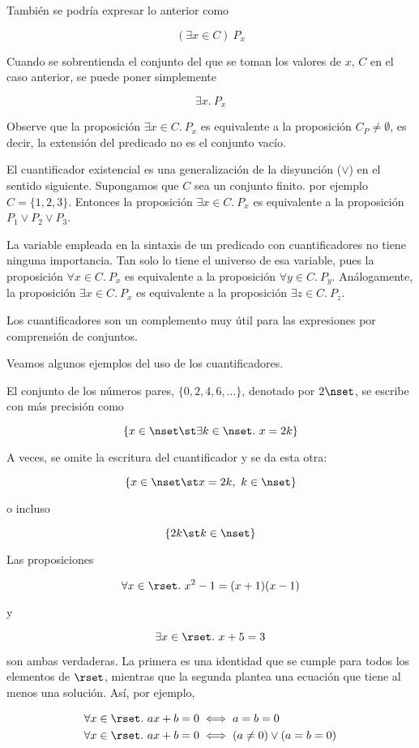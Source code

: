 También se podría expresar lo anterior como

$$ (\exists x \in C) \ P_x $$

Cuando se sobrentienda el conjunto del que se toman los valores de $x$, $C$
en el caso anterior, se puede poner simplemente

$$ \exists x. \ P_x $$

Observe que la proposición $\exists x \in C.\ P_x$ es equivalente a la
proposición $C_P \neq \emptyset$, es decir, la extensión del predicado no es
el conjunto vacío.

El cuantificador existencial es una generalización de la disyunción ($\lor$)
en el sentido siguiente. Supongamos que $C$ sea un conjunto finito. por
ejemplo $C = \{1, 2, 3\}$. Entonces la proposición $\exists x \in C.\ P_x$
es equivalente a la proposición $P_1 \lor P_2 \lor P_3$.

La variable empleada en la sintaxis de un predicado con cuantificadores no
tiene ninguna importancia. Tan solo lo tiene el universo de esa variable,
pues la proposición $\forall x \in C.\ P_x$ es equivalente a la proposición
$\forall y \in C.\ P_y$. Análogamente, la proposición $\exists x \in C.\
P_x$ es equivalente a la proposición $\exists z \in C.\ P_z$.


Los cuantificadores son un complemento muy útil para las expresiones por
comprensión de conjuntos.

\begin{example}[Cuantificadores]
  Veamos algunos ejemplos del uso de los cuantificadores.

  El conjunto de los números pares, $\{0, 2, 4, 6, \ldots\}$, denotado por
  $2\nset$, se escribe con más precisión como

  \[ \{x \in \nset \st \exists k \in \nset. \ x = 2k\} \]

  \noindent A veces, se omite la escritura del cuantificador y se da esta
  otra:

  \[ \{x \in \nset \st x = 2k, \ k \in \nset\} \]

  \noindent o incluso

  \[ \{2k \st k \in \nset\} \]

  Las proposiciones

  \[ \forall x \in \rset. \ x^2 - 1 = (x + 1)(x - 1) \]

  \noindent y

  \[ \exists x \in \rset. \ x + 5 = 3 \]

  \noindent son ambas verdaderas. La primera es una identidad que se cumple
  para todos los elementos de $\rset$, mientras que la segunda plantea una
  ecuación que tiene al menos una solución. Así, por ejemplo,

  \begin{align*}
    \forall x \in \rset. \ ax + b = 0 &\iff a = b = 0 \\
    \forall x \in \rset. \ ax + b = 0 &\iff (a \neq 0) \lor (a = b = 0)
  \end{align*}
\end{example}

